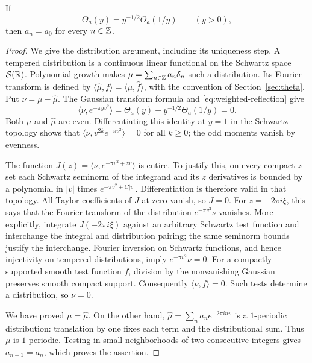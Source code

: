 \begin{theorem}\label{thm:rigidity}
If
\begin{equation}\label{eq:weighted-reflection}
 \Theta_a(y)=y^{-1/2}\Theta_a(1/y)\qquad(y>0),
\end{equation}
then $a_n=a_0$ for every $n\in\mathbb Z$.
\end{theorem}
\begin{proof}
We give the distribution argument, including its uniqueness step.
A tempered distribution is a continuous linear functional on the Schwartz
space $\mathcal S(\mathbb R)$. Polynomial growth makes
$\mu=\sum_{n\in\mathbb Z}a_n\delta_n$ such a distribution. Its Fourier transform is
defined by $\langle\widehat\mu,f\rangle=\langle\mu,\widehat f\rangle$,
with the convention of Section~\ref{sec:theta}. Put $\nu=\mu-\widehat\mu$.
The Gaussian transform formula and \eqref{eq:weighted-reflection} give
\[
 \langle\nu,e^{-\pi yv^2}\rangle
 =\Theta_a(y)-y^{-1/2}\Theta_a(1/y)=0 .
\]
Both $\mu$ and $\widehat\mu$ are even. Differentiating this identity at
$y=1$ in the Schwartz topology shows that
$\langle\nu,v^{2k}e^{-\pi v^2}\rangle=0$ for all $k\ge0$; the odd
moments vanish by evenness.

The function
$J(z)=\langle\nu,e^{-\pi v^2+zv}\rangle$ is entire. To justify this,
on every compact $z$ set each Schwartz seminorm of the integrand and
its $z$ derivatives is bounded by a polynomial in $|v|$ times
$e^{-\pi v^2+C|v|}$. Differentiation is therefore valid in that topology.
All Taylor coefficients of $J$ at zero vanish, so $J=0$.
For $z=-2\pi i\xi$, this says that the Fourier transform of the
distribution $e^{-\pi v^2}\nu$ vanishes. More explicitly, integrate
$J(-2\pi i\xi)$ against an arbitrary Schwartz test function and interchange
the integral and distribution pairing; the same seminorm bounds justify
the interchange. Fourier inversion on Schwartz functions, and hence
injectivity on tempered distributions, imply $e^{-\pi v^2}\nu=0$.
For a compactly supported smooth test function $f$, division by the
nonvanishing Gaussian preserves smooth compact support. Consequently
$\langle\nu,f\rangle=0$. Such tests determine a distribution, so $\nu=0$.

We have proved $\mu=\widehat\mu$. On the other hand,
$\widehat\mu=\sum_na_ne^{-2\pi inv}$ is a $1$-periodic distribution:
translation by one fixes each term and the distributional sum. Thus
$\mu$ is $1$-periodic. Testing in small neighborhoods of two consecutive
integers gives $a_{n+1}=a_n$, which proves the assertion.
\end{proof}

